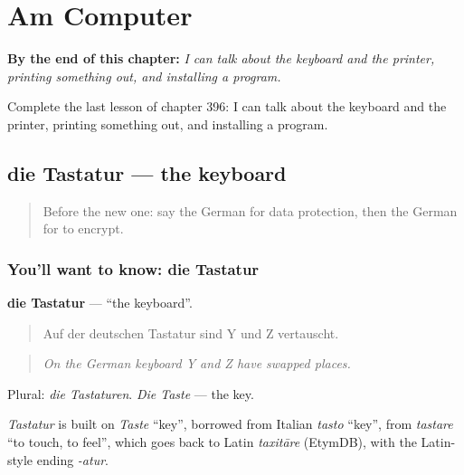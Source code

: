 
\chapter{Am Computer}
\label{ch:ge-am-computer}

\begin{chapteropening}
\textbf{By the end of this chapter:} \emph{I can talk about the keyboard and the printer, printing something out, and installing a program.}

Complete the last lesson of chapter 396: I can talk about the keyboard and the printer, printing something out, and installing a program.
\end{chapteropening}

\section[die Tastatur]{die Tastatur — the keyboard}

\label{lesson:GE-C396-tastatur}



\begin{quote}
Before the new one: say the German for data protection, then the German for to encrypt.
\end{quote}

\subsection*{You'll want to know: die Tastatur}
\textbf{die Tastatur} — \textquotedblleft{}the keyboard\textquotedblright{}.

\begin{quote}
Auf der deutschen Tastatur sind Y und Z vertauscht.
\end{quote}

\begin{quote}
\emph{On the German keyboard Y and Z have swapped places.}
\end{quote}

Plural: \emph{die Tastaturen}. \emph{Die Taste} — the key.

\begin{cousinweb}
\emph{Tastatur} is built on \emph{Taste} \textquotedblleft{}key\textquotedblright{}, borrowed from Italian \emph{tasto} \textquotedblleft{}key\textquotedblright{}, from \emph{tastare} \textquotedblleft{}to touch, to feel\textquotedblright{}, which goes back to Latin \emph{taxitāre} (EtymDB), with the Latin-style ending \emph{-atur}.
\end{cousinweb}

